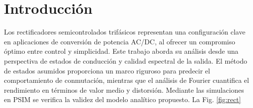 \documentclass[conference]{IEEEtran}
\begin{document}
\IEEEpeerreviewmaketitle



\section{Introducción}
Los rectificadores semicontrolados trifásicos representan una configuración clave en aplicaciones de conversión de potencia AC/DC, al ofrecer un compromiso óptimo entre control y simplicidad.
Este trabajo aborda su análisis desde una perspectiva de estados de conducción y calidad espectral de la salida. El método de estados asumidos proporciona un marco riguroso para predecir el
comportamiento de conmutación, mientras que el análisis de Fourier cuantifica el rendimiento en términos de valor medio y distorsión. Mediante las simulaciones en PSIM se verifica la validez
del modelo analítico propuesto. La Fig. \ref{fig:rect}
\end{document}
